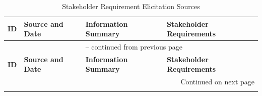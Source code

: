 \documentclass[10pt]{article}
\begin{document}
\begin{longtable}{@{}p{} >{\raggedright\arraybackslash}p{} >{\raggedright\arraybackslash}p{} >{\raggedright\arraybackslash}p{}@{}}

\caption{Stakeholder Requirement Elicitation Sources}
\label{tab:SRESources}\\

\toprule
\textbf{ID} & \textbf{Source and Date} & \textbf{Information Summary} & \textbf{Stakeholder Requirements} \\
\midrule
\endfirsthead

\multicolumn{4}{c}{\tablename\ \thetable{} -- continued from previous page} \\
\toprule
\textbf{ID} & \textbf{Source and Date} & \textbf{Information Summary} & \textbf{Stakeholder Requirements} \\
\midrule
\endhead

\midrule
\multicolumn{4}{r}{Continued on next page} \\
\endfoot

\bottomrule
\endlastfoot


\end{longtable}
\end{document}
